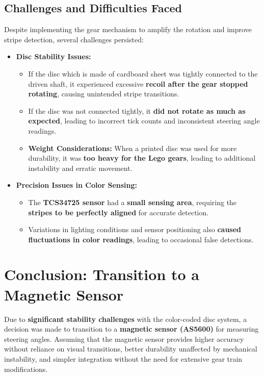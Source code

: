 \subsection{Challenges and Difficulties Faced}
Despite implementing the gear mechanism to amplify the rotation and improve stripe detection, several challenges persisted:
\begin{itemize}
    \item \textbf{Disc Stability Issues:}
    \begin{itemize}
        \item If the disc which is made of cardboard sheet was tightly connected to the driven shaft, it experienced excessive \textbf{recoil after the gear stopped rotating}, causing unintended stripe transitions.
        \item If the disc was not connected tightly, it \textbf{did not rotate as much as expected}, leading to incorrect tick counts and inconsistent steering angle readings.
    
        \item \textbf{Weight Considerations:} When a printed disc was used for more durability, it was \textbf{too heavy for the Lego gears}, leading to additional instability and erratic movement.
    \end{itemize}
   
    \item \textbf{Precision Issues in Color Sensing:}
    \begin{itemize}
        \item The \textbf{TCS34725 sensor} had a \textbf{small sensing area}, requiring the \textbf{stripes to be perfectly aligned} for accurate detection.
        \item Variations in lighting conditions and sensor positioning also \textbf{caused fluctuations in color readings}, leading to occasional false detections.
    \end{itemize}
    
\end{itemize}


\section{Conclusion: Transition to a Magnetic Sensor}
Due to \textbf{significant stability challenges} with the color-coded disc system, a decision was made to transition to a \textbf{magnetic sensor (AS5600)} for measuring steering angles. Assuming that the magnetic sensor provides higher accuracy without reliance on visual transitions, better durability unaffected by mechanical instability, and simpler integration without the need for extensive gear train modifications.



